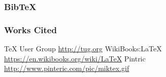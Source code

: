 \documentclass{beamer}
\begin{document}
\begin{frame}
  \frametitle{Bib{\TeX}}
\end{frame}


\begin{frame}
  \frametitle{Works Cited}
  \begin{thebibliography}{9}
     {\TeX} User Group \url{http://tug.org}
     WikiBooks:{\LaTeX} \url{https://en.wikibooks.org/wiki/LaTeX}
     Pintric \url{http://www.pinteric.com/pic/miktex.gif}
  \end{thebibliography}
\end{frame}

  
\end{document}
